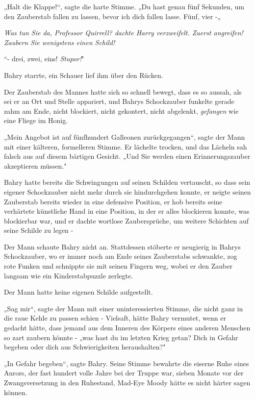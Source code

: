 {„Halt die Klappe!“, sagte die harte Stimme. „Du hast genau fünf Sekunden, um den Zauberstab fallen zu lassen, bevor ich dich fallen lasse. Fünf, vier -„

\emph{\emph{Was tun Sie da, Professor Quirrell?} dachte Harry verzweifelt. \emph{Zuerst angreifen!} \emph{Zaubern Sie} \emph{wenigstens einen Schild!}}

“- drei, zwei, eins! \emph{Stupor!}"

Bahry starrte, ein Schauer lief ihm über den Rücken.

Der Zauberstab des Mannes hatte sich so schnell bewegt, dass es so aussah, als sei er an Ort und Stelle appariert, und Bahrys Schockzauber funkelte gerade zahm am Ende, nicht blockiert, nicht gekontert, nicht abgelenkt, \emph{gefangen} wie eine Fliege im Honig.

„Mein Angebot ist auf fünfhundert Galleonen zurückgegangen“, sagte der Mann mit einer kälteren, formelleren Stimme. Er lächelte trocken, und das Lächeln sah falsch aus auf diesem bärtigen Gesicht. „Und Sie werden einen Erinnerungszauber akzeptieren müssen."

Bahry hatte bereits die Schwingungen auf seinen Schilden vertauscht, so dass sein eigener Schockzauber nicht mehr durch sie hindurchgehen konnte, er neigte seinen Zauberstab bereits wieder in eine defensive Position, er hob bereits seine verhärtete künstliche Hand in eine Position, in der er alles blockieren konnte, was blockierbar war, und er dachte wortlose Zaubersprüche, um weitere Schichten auf seine Schilde zu legen -

Der Mann schaute Bahry nicht an. Stattdessen stöberte er neugierig in Bahrys Schockzauber, wo er immer noch am Ende seines Zauberstabs schwankte, zog rote Funken und schnippte sie mit seinen Fingern weg, wobei er den Zauber langsam wie ein Kinderstabpuzzle zerlegte.

Der Mann hatte keine eigenen Schilde aufgestellt.

„Sag mir“, sagte der Mann mit einer uninteressierten Stimme, die nicht ganz in die raue Kehle zu passen schien - Vielsaft, hätte Bahry vermutet, wenn er gedacht hätte, dass jemand aus dem Inneren des Körpers eines anderen Menschen so zart zaubern könnte - „was hast du im letzten Krieg getan? Dich in Gefahr begeben oder dich aus Schwierigkeiten heraushalten?"

„In Gefahr begeben“, sagte Bahry. Seine Stimme bewahrte die eiserne Ruhe eines Aurors, der fast hundert volle Jahre bei der Truppe war, sieben Monate vor der Zwangsversetzung in den Ruhestand, Mad-Eye Moody hätte es nicht härter sagen können.

}
